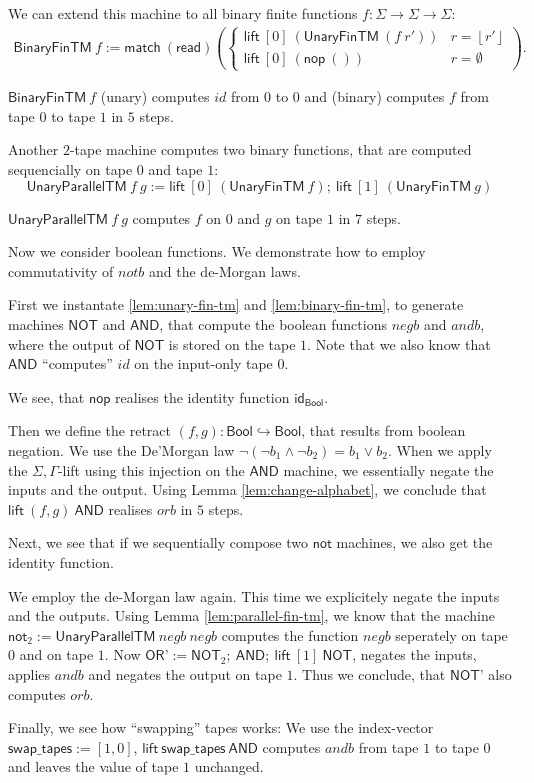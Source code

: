 \documentclass{psartcl}
\newcommand{\MS}[1]{\textsf{#1}}
\newcommand{\from}{:}
\renewcommand{\to}{\rightarrow}
\newcommand{\Bool}{\MS{Bool}}
\newcommand{\Some}[1]{\left\lfloor #1\right\rfloor}
\renewcommand{\None}{\emptyset}
\newcommand{\unit}{\mathbf{()}}
\newcommand{\Tau}{\Gamma}
\newcommand{\mseq}{;~}
\begin{document}
We can extend this machine to all binary finite functions $f\from\Sigma\to\Sigma\to\Sigma$:
\begin{align*}
  \MS{BinaryFinTM}~f :=
  \MS{match}~(\MS{read})
  \left(
    \begin{cases}
      \MS{lift}~[0]~(\MS{UnaryFinTM}~(f~r')) & r=\Some{r'} \\
      \MS{lift}~[0]~(\MS{nop}~\unit)         & r=\None
    \end{cases}
  \right).
\end{align*}
\begin{lemma}
  \label{lem:binary-fin-tm}
  $\MS{BinaryFinTM}~f$ (unary) computes $id$ from $0$ to $0$ and (binary) computes $f$ from tape $0$ to tape $1$ in $5$ steps.
\end{lemma}

Another $2$-tape machine computes two binary functions, that are computed sequencially on tape $0$ and tape $1$:
$$ \MS{UnaryParallelTM}~f~g := \MS{lift}~[0]~(\MS{UnaryFinTM}~f) \mseq \MS{lift}~[1]~(\MS{UnaryFinTM}~g) $$

\begin{lemma}
  \label{lem:parallel-fin-tm}
  $\MS{UnaryParallelTM}~f~g$ computes $f$ on $0$ and $g$ on tape $1$ in $7$ steps.
\end{lemma}


Now we consider boolean functions.  We demonstrate how to employ commutativity of $notb$ and the de-Morgan laws.

First we instantate \ref{lem:unary-fin-tm} and \ref{lem:binary-fin-tm}, to generate machines $\MS{NOT}$ and $\MS{AND}$, that compute the boolean
functions $negb$ and $andb$, where the output of $\MS{NOT}$ is stored on the tape $1$.
Note that we also know that $\MS{AND}$ ``computes'' $id$ on the input-only tape $0$.

We see, that $\MS{nop}$ realises the identity function $\MS{id}_\Bool$.

Then we define the retract $(f, g) \from \Bool \hookrightarrow \Bool$, that results from boolean negation.
We use the De'Morgan law $\neg(\neg b_1 \land \neg b_2) = b_1 \lor b_2$.
When we apply the $\Sigma,\Tau$-lift using this injection on the $\MS{AND}$ machine, we essentially negate the inputs and the output.
Using Lemma \ref{lem:change-alphabet}, we conclude that $\MS{lift}~(f,g)~\MS{AND}$ realises $orb$ in $5$ steps.

Next, we see that if we sequentially compose two $\MS{not}$ machines, we also get the identity function.

We employ the de-Morgan law again.  This time we explicitely negate the inputs and the outputs.
Using Lemma \ref{lem:parallel-fin-tm}, we know that the machine $\MS{not}_2 := \MS{UnaryParallelTM}~negb~negb$ computes the function $negb$
seperately on tape $0$ and on tape $1$.
Now $\MS{OR'} := \MS{NOT}_2 \mseq \MS{AND} \mseq \MS{lift}~[1]~\MS{NOT}$, negates the inputs, applies $andb$ and negates the output on tape $1$.
Thus we conclude, that $\MS{NOT'}$ also computes $orb$.

Finally, we see how ``swapping'' tapes works:  We use the index-vector $\MS{swap\_tapes} := [1,0]$, $\MS{lift}~\MS{swap\_tapes}~\MS{AND}$ computes
$andb$ from tape $1$ to tape $0$ and leaves the value of tape $1$ unchanged.
\end{document}
